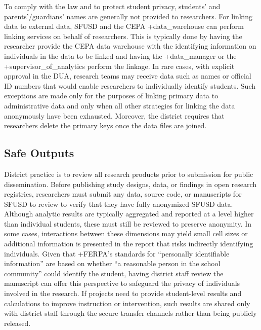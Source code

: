 \documentclass[
]{book}
\begin{document}
To comply with the law and to protect student privacy, students' and parents'/guardians' names are generally not provided to researchers. For linking data to external data, SFUSD and the CEPA +data\_warehouse\textbar{} can perform linking services on behalf of researchers. This is typically done by having the researcher provide the CEPA data warehouse with the identifying information on individuals in the data to be linked and having the +data\_manager\textbar{} or the +supervisor\_of\_analytics\textbar{} perform the linkage. In rare cases, with explicit approval in the DUA, research teams may receive data such as names or official ID numbers that would enable researchers to individually identify students. Such exceptions are made only for the purposes of linking primary data to administrative data and only when all other strategies for linking the data anonymously have been exhausted. Moreover, the district requires that researchers delete the primary keys once the data files are joined.

\hypertarget{safe-outputs-5}{%
\subsection{Safe Outputs}\label{safe-outputs-5}}

District practice is to review all research products prior to submission for public dissemination. Before publishing study designs, data, or findings in open research registries, researchers must submit any data, source code, or manuscripts for SFUSD to review to verify that they have fully anonymized SFUSD data. Although analytic results are typically aggregated and reported at a level higher than individual students, these must still be reviewed to preserve anonymity. In some cases, interactions between these dimensions may yield small cell sizes or additional information is presented in the report that risks indirectly identifying individuals. Given that +FERPA\textbar's standards for ``personally identifiable information'' are based on whether ``a reasonable person in the school community'' could identify the student, having district staff review the manuscript can offer this perspective to safeguard the privacy of individuals involved in the research. If projects need to provide student-level results and calculations to improve instruction or intervention, such results are shared only with district staff through the secure transfer channels rather than being publicly released.
\end{document}
